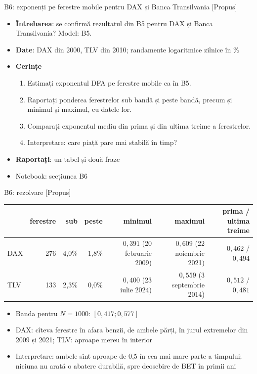 \begin{frame}{B6: exponenți pe ferestre mobile pentru DAX și Banca Transilvania [Propus]}
\itemsize{\footnotesize}
\begin{itemize}
\item \textbf{Întrebarea}: se confirmă rezultatul din B5 pentru DAX și Banca Transilvania? Model: B5.
\item \textbf{Date}: DAX din 2000, TLV din 2010; randamente logaritmice zilnice în \%
\item \textbf{Cerințe}
\begin{enumerate}
    \item Estimați exponentul DFA pe ferestre mobile ca în B5.
    \item Raportați ponderea ferestrelor sub bandă și peste bandă, precum și minimul și maximul, cu datele lor.
    \item Comparați exponentul mediu din prima și din ultima treime a ferestrelor.
    \item Interpretare: care piață pare mai stabilă în timp?
\end{enumerate}
\item \textbf{Raportați}: un tabel și două fraze
\item Notebook: secțiunea B6
\end{itemize}
\end{frame}

\ifsolutions
\begin{frame}{B6: rezolvare [Propus]}
\itemsize{\footnotesize}
\begin{center}
\scriptsize
\begin{tabular}{lrrrrrr}
\toprule
 & ferestre & sub & peste & minimul & maximul & prima / ultima treime \\
\midrule
DAX & 276 & 4{,}0\% & 1{,}8\% & $0{,}391$ (20 februarie 2009) & $0{,}609$ (22 noiembrie 2021) & $0{,}462$ / $0{,}494$ \\
TLV & 133 & 2{,}3\% & 0{,}0\% & $0{,}400$ (23 iulie 2024) & $0{,}559$ (3 septembrie 2014) & $0{,}512$ / $0{,}481$ \\
\bottomrule
\end{tabular}
\end{center}
\begin{itemize}
    \item Banda pentru $N = 1000$: $[0{,}417; 0{,}577]$
    \item DAX: cîteva ferestre în afara benzii, de ambele părți, în jurul extremelor din 2009 și 2021; TLV: aproape mereu în interior
    \item Interpretare: ambele sînt aproape de 0,5 în cea mai mare parte a timpului; niciuna nu arată o abatere durabilă, spre deosebire de BET în primii ani
\end{itemize}
\end{frame}
\fi


